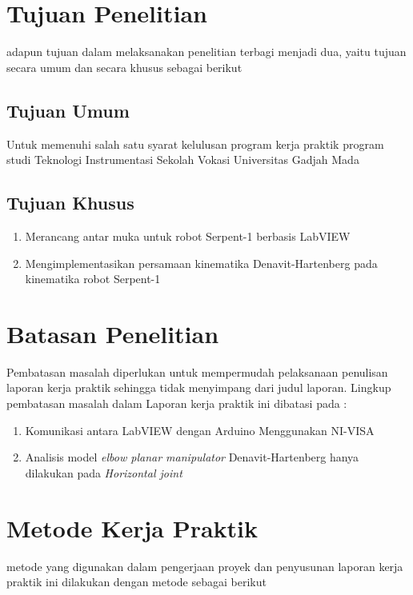 \section{Tujuan Penelitian}
adapun tujuan dalam melaksanakan penelitian terbagi menjadi dua, yaitu tujuan secara umum dan secara khusus sebagai berikut

	\subsection{Tujuan Umum}
	
		Untuk memenuhi salah satu syarat kelulusan program kerja praktik program studi Teknologi Instrumentasi Sekolah Vokasi Universitas Gadjah Mada
		
	\subsection{Tujuan Khusus}
	
	\begin{enumerate}
		\item Merancang antar muka untuk robot Serpent-1 berbasis LabVIEW
		\item Mengimplementasikan persamaan kinematika Denavit-Hartenberg pada kinematika robot Serpent-1
	\end{enumerate}
	
\section{Batasan Penelitian}
	Pembatasan masalah diperlukan untuk mempermudah pelaksanaan penulisan laporan kerja praktik sehingga tidak menyimpang dari judul laporan. Lingkup pembatasan masalah dalam Laporan kerja praktik ini dibatasi pada :
	
	\begin{enumerate}
		
		\item Komunikasi antara LabVIEW dengan Arduino Menggunakan NI-VISA
		\item Analisis model \textit{elbow planar manipulator} Denavit-Hartenberg hanya dilakukan pada \textit{Horizontal joint}
		
	\end{enumerate}

\section{Metode Kerja Praktik}
metode yang digunakan dalam pengerjaan proyek dan penyusunan laporan kerja praktik ini dilakukan dengan metode sebagai berikut

